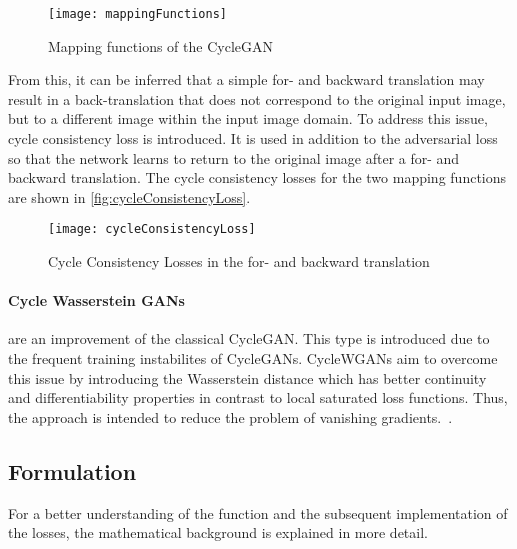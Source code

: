 \documentclass[fleqn,10pt]{SelfArx} %
\begin{document}
\begin{figure} \centering 
	\texttt{[image: mappingFunctions]}
	\caption{Mapping functions of the Cycle\ac{GAN}~\cite{image-to-image-ccan}}
	\label{fig:mappingFunctions}
\end{figure}

From this, it can be inferred that a simple for- and backward translation may result in a back-translation that does not correspond to the original input image, but to a different image within the input image domain. To address this issue, cycle consistency loss is introduced. It is used in addition to the adversarial loss so that the network learns to return to the original image after a for- and backward translation. The cycle consistency losses for the two mapping functions are shown in \autoref{fig:cycleConsistencyLoss}.~\cite{image-to-image-ccan}

\begin{figure*}[htb] \centering 
	\texttt{[image: cycleConsistencyLoss]}
	\caption{Cycle Consistency Losses in the for- and backward translation~\cite{image-to-image-ccan}}
	\label{fig:cycleConsistencyLoss}
\end{figure*}

\paragraph{Cycle Wasserstein \ac{GAN}s} are an improvement of the classical Cycle\ac{GAN}. This type is introduced due to the frequent training instabilites of Cycle\ac{GAN}s. CycleW\ac{GAN}s aim to overcome this issue by introducing the Wasserstein distance which has better continuity and differentiability properties in contrast to local saturated loss functions. Thus, the approach is intended to reduce the problem of vanishing gradients.~\cite{wgan-improvement}.

\subsection{Formulation}
For a better understanding of the function and the subsequent implementation of the losses, the mathematical background is explained in more detail.
\end{document}
